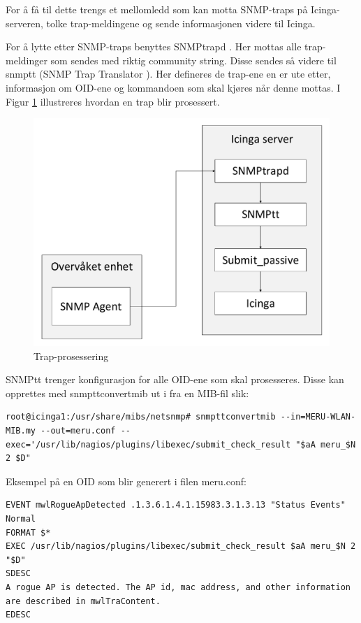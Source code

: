 For å få til dette trengs et mellomledd som kan motta SNMP-traps på Icinga-serveren, tolke trap-meldingene og sende informasjonen videre til Icinga. 

For å lytte etter SNMP-traps benyttes SNMPtrapd \cite{snmptraps2}. Her mottas alle trap-meldinger som sendes med riktig community string. Disse sendes så videre til snmptt (SNMP Trap Translator \cite{traptranselator}). Her defineres de trap-ene en er ute etter, informasjon om OID-ene og kommandoen som skal kjøres når denne mottas. I Figur \ref{snmptrap} illustreres hvordan en trap blir prosessert. 

\begin{figure}[H]
    \centering
    \includegraphics[scale=0.4]{img/SNMPtrap}
    \caption{Trap-prosessering}
    \label{snmptrap}
\end{figure}

SNMPtt trenger konfigurasjon for alle OID-ene som skal prosesseres. Disse kan opprettes med snmpttconvertmib ut i fra en MIB-fil slik:

\begin{lstlisting}[style=example]
root@icinga1:/usr/share/mibs/netsnmp# snmpttconvertmib --in=MERU-WLAN-MIB.my --out=meru.conf --exec='/usr/lib/nagios/plugins/libexec/submit_check_result "$aA meru_$N 2 $D"
\end{lstlisting}

Eksempel på en OID som blir generert i filen meru.conf:

\begin{lstlisting}[style=example]
EVENT mwlRogueApDetected .1.3.6.1.4.1.15983.3.1.3.13 "Status Events" Normal
FORMAT $*
EXEC /usr/lib/nagios/plugins/libexec/submit_check_result $aA meru_$N 2 "$D"
SDESC
A rogue AP is detected. The AP id, mac address, and other information are described in mwlTraContent.
EDESC
\end{lstlisting}

